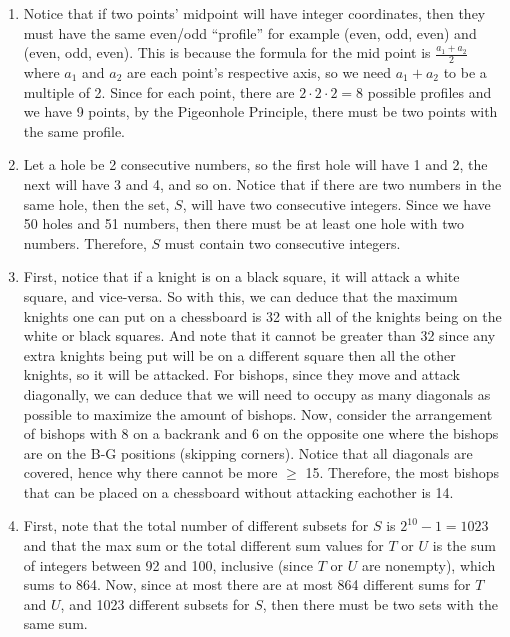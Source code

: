 \documentclass[12pt]{article}
\begin{document}
\begin{enumerate}
    \item Notice that if two points' midpoint will have integer coordinates, then 
    they must have the same even/odd ``profile'' for example (even, odd, even) and
    (even, odd, even). This is because the formula for the mid point is $\frac{a_1 + a_2}{2}
    $ where $a_1$ and $a_2$ are each point's respective axis, so we need $a_1 + a_2$ 
    to be a multiple of 2. Since for each point, there are $2\cdot2\cdot2 = 8$ 
    possible profiles and we have 9 points, by the Pigeonhole Principle, there 
    must be two points with the same profile. 
    \item Let a hole be 2 consecutive numbers, so the first hole will have 1 and 2, 
    the next will have 3 and 4, and so on. Notice that if there are two numbers in 
    the same hole, then the set, $S$, will have two consecutive integers. Since 
    we have 50 holes and 51 numbers, then there must be at least one hole with two 
    numbers. Therefore, $S$ must contain two consecutive integers.
    \item First, notice that if a knight is on a black square, it will attack a 
    white square, and vice-versa. So with this, we can deduce that the maximum 
    knights one can put on a chessboard is 32 with all of the knights being on 
    the white or black squares. And note that it cannot be greater than 32 since 
    any extra knights being put will be on a different square then all the other 
    knights, so it will be attacked. For bishops, since they move and attack 
    diagonally, we can deduce that we will need to occupy as many diagonals as 
    possible to maximize the amount of bishops. Now, consider the arrangement of 
    bishops with 8 on a backrank and 6 on the opposite one where the bishops are 
    on the B-G positions (skipping corners). Notice that all diagonals are covered, 
    hence why there cannot be more $\geq$ 15. Therefore, the most bishops that can 
    be placed on a chessboard without attacking eachother is 14.
    \item First, note that the total number of different subsets for $S$ is $2^{10}-1 = 1023$
    and that the max sum or the total different sum values for $T$ or $U$ is the sum 
    of integers between 92 and 100, inclusive (since $T$ or $U$ are nonempty), which 
    sums to 864. Now, since at most there are at most 864 different sums for $T$ and $U$, 
    and 1023 different subsets for $S$, then there must be two sets with the same sum.

\end{enumerate}
\end{document}
